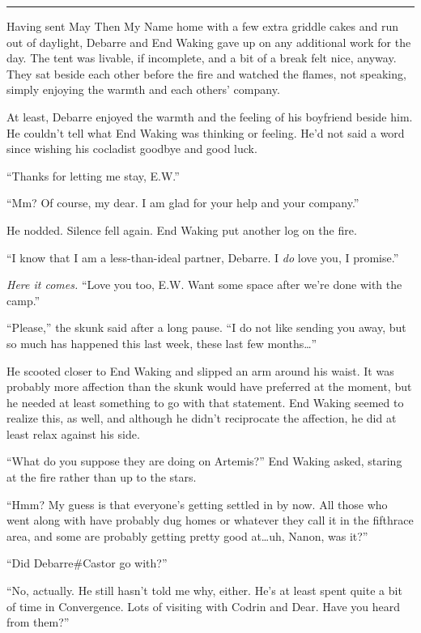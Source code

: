 \begin{center}\rule{0.5\linewidth}{0.5pt}\end{center}

Having sent May Then My Name home with a few extra griddle cakes and run out of daylight, Debarre and End Waking gave up on any additional work for the day. The tent was livable, if incomplete, and a bit of a break felt nice, anyway. They sat beside each other before the fire and watched the flames, not speaking, simply enjoying the warmth and each others' company.

At least, Debarre enjoyed the warmth and the feeling of his boyfriend beside him. He couldn't tell what End Waking was thinking or feeling. He'd not said a word since wishing his cocladist goodbye and good luck.

``Thanks for letting me stay, E.W.''

``Mm? Of course, my dear. I am glad for your help and your company.''

He nodded. Silence fell again. End Waking put another log on the fire.

``I know that I am a less-than-ideal partner, Debarre. I \emph{do} love you, I promise.''

\emph{Here it comes.} ``Love you too, E.W. Want some space after we're done with the camp.''

``Please,'' the skunk said after a long pause. ``I do not like sending you away, but so much has happened this last week, these last few months\ldots{}''

He scooted closer to End Waking and slipped an arm around his waist. It was probably more affection than the skunk would have preferred at the moment, but he needed at least something to go with that statement. End Waking seemed to realize this, as well, and although he didn't reciprocate the affection, he did at least relax against his side.

``What do you suppose they are doing on Artemis?'' End Waking asked, staring at the fire rather than up to the stars.

``Hmm? My guess is that everyone's getting settled in by now. All those who went along with have probably dug homes or whatever they call it in the fifthrace area, and some are probably getting pretty good at\ldots uh, Nanon, was it?''

``Did Debarre\#Castor go with?''

``No, actually. He still hasn't told me why, either. He's at least spent quite a bit of time in Convergence. Lots of visiting with Codrin and Dear. Have you heard from them?''

